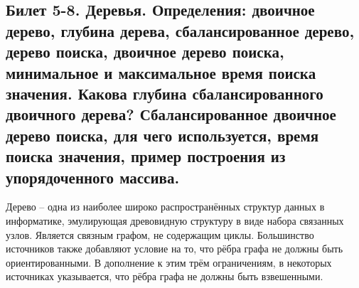 \documentclass[a4paper, 12pt]{article}
\begin{document}
	\subsection*{Билет 5-8.  Деревья. Определения: двоичное дерево, глубина дерева, сбалансированное дерево, дерево поиска, двоичное дерево поиска, минимальное и максимальное время поиска значения. Какова глубина сбалансированного двоичного дерева? Сбалансированное двоичное дерево поиска, для чего используется, время поиска значения, пример построения из упорядоченного  массива.
	}
	Дерево -- одна из наиболее широко распространённых структур данных в информатике, эмулирующая древовидную структуру в виде набора связанных узлов. Является связным графом, не содержащим циклы. Большинство источников также добавляют условие на то, что рёбра графа не должны быть ориентированными. В дополнение к этим трём ограничениям, в некоторых источниках указывается, что рёбра графа не должны быть взвешенными.
	
\end{document}
